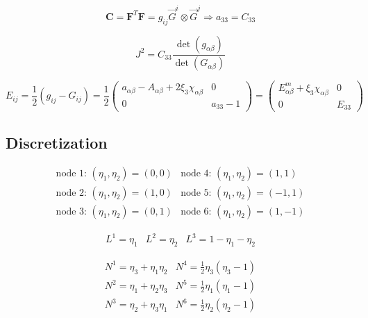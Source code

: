 \documentclass[12pt]{article}
\begin{document}
\begin{equation}
\pmb{C} = \pmb{F}^T\pmb{F} = g_{ij}\vec{G}^i\otimes\vec{G}^j
 \Rightarrow a_{33} = C_{33}
\end{equation}

\begin{equation}
J^2 = C_{33}\frac{\det(g_{\alpha\beta})}{\det(G_{\alpha\beta})}
\end{equation}

\begin{equation}
E_{ij} = \frac{1}{2} (g_{ij} - G_{ij}) = 
\frac{1}{2}\left(\begin{array}{cc}
a_{\alpha\beta} - A_{\alpha\beta} + 2\xi_3\chi_{\alpha\beta} & 0 \\
 0 & a_{33} -1
\end{array}\right) = 
\left(\begin{array}{cc}
E^m_{\alpha\beta} + \xi_3\chi_{\alpha\beta} & 0 \\
 0 & E_{33}
\end{array}\right)
\end{equation}

%
\subsection{Discretization}
%
\begin{equation}
\begin{array}{cc}
\mbox{node 1: }(\eta_1,\eta_2)=(0,0) & \mbox{node 4: }(\eta_1,\eta_2)=(1,1) \\
\mbox{node 2: }(\eta_1,\eta_2)=(1,0) & \mbox{node 5: }(\eta_1,\eta_2)=(-1,1) \\
\mbox{node 3: }(\eta_1,\eta_2)=(0,1) & \mbox{node 6: }(\eta_1,\eta_2)=(1,-1)
\end{array}
\end{equation}

\begin{equation}
\begin{array}{ccc}
L^1=\eta_1 & L^2=\eta_2 & L^3=1-\eta_1-\eta_2
\end{array}
\end{equation}

\begin{equation}
\begin{array}{cc}
N^1 = \eta_3 + \eta_1\eta_2 & N^4 = \frac{1}{2}\eta_3(\eta_3 - 1) \\
N^2 = \eta_1 + \eta_2\eta_3 & N^5 = \frac{1}{2}\eta_1(\eta_1 - 1) \\
N^3 = \eta_2 + \eta_3\eta_1 & N^6 = \frac{1}{2}\eta_2(\eta_2 - 1)
\end{array}
\end{equation}
\end{document}
